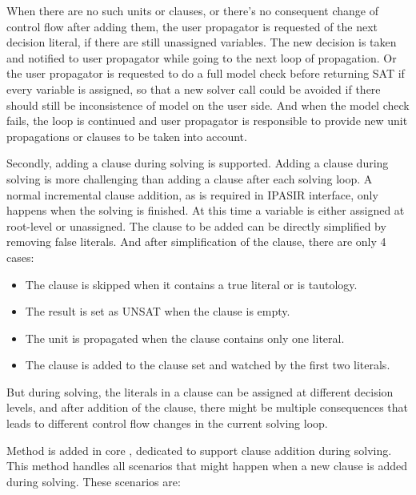 When there are no such units or clauses, or there's no consequent change of control flow after adding them, the user propagator is requested of the next decision literal, if there are still unassigned variables. The new decision is taken and notified to user propagator while going to the next loop of propagation. Or the user propagator is requested to do a full model check before returning SAT if every variable is assigned, so that a new solver call could be avoided if there should still be inconsistence of model on the user side. And when the model check fails, the loop is continued and user propagator is responsible to provide new unit propagations or clauses to be taken into account.

Secondly, adding a clause during solving is supported. Adding a clause during solving is more challenging than adding a clause after each solving loop. A normal incremental clause addition, as is required in IPASIR interface, only happens when the solving is finished. At this time a variable is either assigned at root-level or unassigned. The clause to be added can be directly simplified by removing false literals. And after simplification of the clause, there are only 4 cases:

\begin{itemize}
  \item The clause is skipped when it contains a true literal or is tautology.
  \item The result is set as UNSAT when the clause is empty.
  \item The unit is propagated when the clause contains only one literal.
  \item The clause is added to the clause set and watched by the first two literals.
\end{itemize}

But during solving, the literals in a clause can be assigned at different decision levels, and after addition of the clause, there might be multiple consequences that leads to different control flow changes in the current solving loop.

Method  is added in core , dedicated to support clause addition during solving. This method handles all scenarios that might happen when a new clause is added during solving. These scenarios are:

